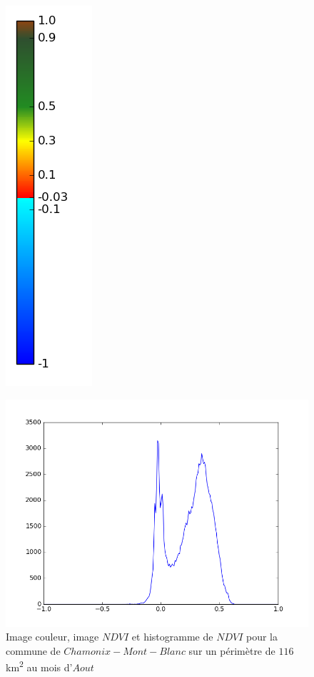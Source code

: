 \documentclass{book}
\begin{document}
\begin{figure}[H]
{\includegraphics[scale=0.4]{../3_ndvi/images/colormap.png}
}
\begin{center}
\includegraphics[scale=0.45]{../3_ndvi/images/Chamonix/08_ndvi_histo.png}
\end{center}
\caption{Image couleur, image $NDVI$ et histogramme de $NDVI$ pour la commune de $Chamonix-Mont-Blanc$ sur un périmètre de $116$km\textsuperscript{2} au mois d'$Aout$}
\label{chamonix_ndvi}
\end{figure}
\end{document}
